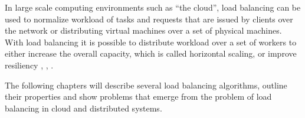 In large scale computing environments such as ``the cloud'', load balancing can
be used to normalize workload of tasks and requests that are issued by
clients over the network \cite{alakeel2010guide} or distributing virtual machines
over a set of physical machines.
With load balancing it is possible to distribute workload over a set of workers
to either increase the overall capacity, which is called horizontal scaling,
or improve resiliency \cite{areYouLoadBalancingWrong}, \cite{aTaxonomyAndSurv},
\cite{cloudLBTech}.

The following chapters will describe several load balancing algorithms, outline
their properties and show problems that emerge from the problem of load
balancing in cloud and distributed systems.

